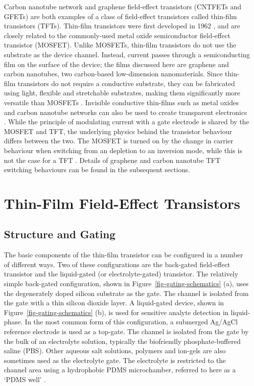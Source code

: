 \documentclass[
  a4paper,
]{scrbook}
\begin{document}
Carbon nanotube network and graphene field-effect transistors (CNTFETs
and GFETs) are both examples of a class of field-effect transistors
called thin-film transistors (TFTs). Thin-film transistors were first
developed in 1962 \autocite{Weimer1962}, and are closely related to the
commonly-used metal oxide semiconductor field-effect transistor
(MOSFET). Unlike MOSFETs, thin-film transistors do not use the substrate
as the device channel. Instead, current passes through a semiconducting
film on the surface of the device; the films discussed here are graphene
and carbon nanotubes, two carbon-based low-dimension nanomaterials.
Since thin-film transistors do not require a conductive substrate, they
can be fabricated using light, flexible and stretchable substrates,
making them significantly more versatile than MOSFETs
\autocite{Cao2009,Petti2016,Shkodra2021}. Invisible conductive
thin-films such as metal oxides and carbon nanotube networks can also be
used to create transparent electronics \autocite{Cao2009}. While the
principle of modulating current with a gate electrode is shared by the
MOSFET and TFT, the underlying physics behind the transistor behaviour
differs between the two. The MOSFET is turned on by the change in
carrier behaviour when switching from an depletion to an inversion mode,
while this is not the case for a TFT \autocite{Petti2016}. Details of
graphene and carbon nanotube TFT switching behaviours can be found in
the subsequent sections.

\hypertarget{sec-general-FETs}{%
\section{Thin-Film Field-Effect Transistors}\label{sec-general-FETs}}

\hypertarget{sec-gating}{%
\subsection{Structure and Gating}\label{sec-gating}}

The basic components of the thin-film transistor can be configured in a
number of different ways. Two of these configurations are the back-gated
field-effect transistor and the liquid-gated (or electrolyte-gated)
transistor. The relatively simple back-gated configuration, shown in
Figure~\ref{fig-gating-schematics} (a), uses the degenerately doped
silicon substrate as the gate. The channel is isolated from the gate
with a thin silicon dioxide layer. A liquid-gated device, shown in
Figure~\ref{fig-gating-schematics} (b), is used for sensitive analyte
detection in liquid-phase. In the most common form of this
configuration, a submerged Ag/AgCl reference electrode is used as a
top-gate. The channel is isolated from the gate by the bulk of an
electrolyte solution, typically the biofriendly phosphate-buffered
saline (PBS). Other aqueous salt solutions, polymers and ion-gels are
also sometimes used as the electrolyte gate. The electrolyte is
restricted to the channel area using a hydrophobic PDMS microchamber,
referred to here as a `PDMS well'
\autocite{Avouris2007,Shkodra2021,Tran2016,Li2023}.
\end{document}
